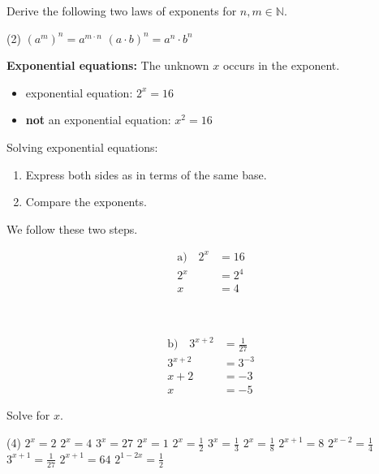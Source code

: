 \begin{exercise}
	Derive the following two laws of exponents for $n,m\in\mathbb N$.
	\begin{tasks}(2)
		\task $\left(a^m\right)^n=a^{m\cdot n}$
		\task $\left(a\cdot b\right)^n=a^n\cdot b^n$
	\end{tasks}
\end{exercise}
\pagebreak[4]
\begin{tcolorbox}
	\textbf{Exponential equations:} The unknown $x$ occurs in the exponent.
	\begin{itemize}
		\item exponential equation: $2^x=16$
		\item \textbf{not} an exponential equation: $x^2=16$
	\end{itemize}
	Solving exponential equations:
	\begin{enumerate}[Step 1:]
		\item Express both sides as in terms of the same base.
		\item Compare the exponents.
	\end{enumerate}
\end{tcolorbox}
\begin{example}
	We follow these two steps.\\
	\begin{minipage}{0.45\textwidth}
		\begin{align*}
			\textrm{a)}\quad 2^x&=16 \\
			2^x&=2^4 \\
			x&=4 \\
			\phantom{x+2}& \\
			\phantom{x+2}&
		\end{align*}
	\end{minipage}\hfill
	\begin{minipage}{0.45\textwidth}
		\begin{align*}
			\textrm{b)}\quad 3^{x+2}&=\frac{1}{27} \\
			3^{x+2}&=3^{-3} \\
			x+2&=-3 \\
			x&=-5
		\end{align*}
	\end{minipage}
\end{example}
\begin{exercise}
	Solve for $x$.
	\begin{tasks}(4)
		\task $2^x=2$ \task $2^x=4$ \task $3^x=27$ \task $2^x=1$
		\task $2^x=\frac{1}{2}$ \task $3^x=\frac{1}{3}$ \task $2^x=\frac{1}{8}$ \task $2^{x+1}=8$
		\task $2^{x-2}=\frac{1}{4}$ \task $3^{x+1}=\frac{1}{27}$ \task $2^{x+1}=64$
		\task $2^{1-2x}=\frac{1}{2}$
	\end{tasks}
\end{exercise}
